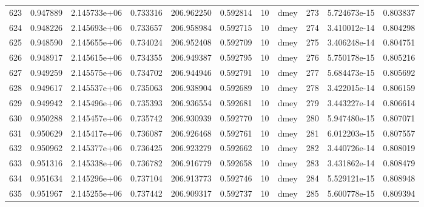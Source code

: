 \begin{tabular}{lrrrrrrlrrr}
623  &    0.947889 &        2.145733e+06 &  0.733316 &              206.962250 &    0.592814 &      10 &         dmey &    273 &   5.724673e-15 &      0.803837 \\
624  &    0.948226 &        2.145693e+06 &  0.733657 &              206.958984 &    0.592715 &      10 &         dmey &    274 &   3.410012e-14 &      0.804298 \\
625  &    0.948590 &        2.145655e+06 &  0.734024 &              206.952408 &    0.592709 &      10 &         dmey &    275 &   3.406248e-14 &      0.804751 \\
626  &    0.948917 &        2.145615e+06 &  0.734355 &              206.949387 &    0.592795 &      10 &         dmey &    276 &   5.750178e-15 &      0.805216 \\
627  &    0.949259 &        2.145575e+06 &  0.734702 &              206.944946 &    0.592791 &      10 &         dmey &    277 &   5.684473e-15 &      0.805692 \\
628  &    0.949617 &        2.145537e+06 &  0.735063 &              206.938904 &    0.592689 &      10 &         dmey &    278 &   3.422015e-14 &      0.806159 \\
629  &    0.949942 &        2.145496e+06 &  0.735393 &              206.936554 &    0.592681 &      10 &         dmey &    279 &   3.443227e-14 &      0.806614 \\
630  &    0.950288 &        2.145457e+06 &  0.735742 &              206.930939 &    0.592770 &      10 &         dmey &    280 &   5.947480e-15 &      0.807071 \\
631  &    0.950629 &        2.145417e+06 &  0.736087 &              206.926468 &    0.592761 &      10 &         dmey &    281 &   6.012203e-15 &      0.807557 \\
632  &    0.950962 &        2.145377e+06 &  0.736425 &              206.923279 &    0.592662 &      10 &         dmey &    282 &   3.440726e-14 &      0.808019 \\
633  &    0.951316 &        2.145338e+06 &  0.736782 &              206.916779 &    0.592658 &      10 &         dmey &    283 &   3.431862e-14 &      0.808479 \\
634  &    0.951634 &        2.145296e+06 &  0.737104 &              206.913773 &    0.592746 &      10 &         dmey &    284 &   5.529121e-15 &      0.808948 \\
635  &    0.951967 &        2.145255e+06 &  0.737442 &              206.909317 &    0.592737 &      10 &         dmey &    285 &   5.600778e-15 &      0.809394 \\

\end{tabular}
